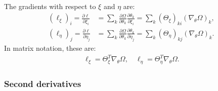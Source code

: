 \documentclass{article}
\begin{document}
The gradients with respect to $\xi$ and $\eta$ are:
%
\begin{align}
  (\ell_\xi)_i = \frac{\partial \ell}{\partial \xi_i}   & = \sum_k \frac{\partial \Omega}{\partial \theta_k} \frac{\partial \theta_k}{\partial \xi_i} = \sum_k (\Theta_\xi)_{ki} (\nabla_\theta \Omega)_k,   \\
  (\ell_\eta)_j = \frac{\partial \ell}{\partial \eta_j} & = \sum_k \frac{\partial \Omega}{\partial \theta_k} \frac{\partial \theta_k}{\partial \eta_j} = \sum_k (\Theta_\eta)_{kj} (\nabla_\theta \Omega)_k.
\end{align}
%
In matrix notation, these are:
%
\begin{align}
  \ell_\xi = \Theta_{\xi}^{T} \nabla_\theta \Omega, \quad \ell_\eta = \Theta_{\eta}^{T} \nabla_\theta \Omega.
\end{align}

\subsubsection{Second derivatives}
\end{document}
